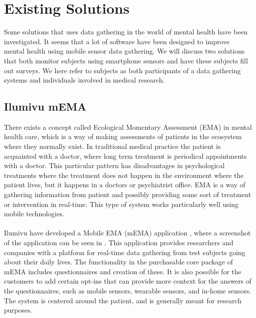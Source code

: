 
\section{Existing Solutions}
\label{sec:existing_solutions}



Some solutions that uses data gathering in the world of mental health have been investigated. It seems that a lot of software have been designed to improve mental health using mobile sensor data gathering. We will discuss two solutions that both monitor subjects using smartphone sensors and have these subjects fill out surveys. We here refer to subjects as both participants of a data gathering systems and individuals involved in medical research.

\subsection{Ilumivu mEMA}
\label{sub:ilumivu_mema}
There exists a concept called Ecological Momentary Assessment (EMA) \parencite{shiffman2008ecological} in mental health care, which is a way of making assessments of patients in the ecosystem where they normally exist. In traditional medical practice the patient is acquainted with a doctor, where long term treatment is periodical appointments with a doctor. This particular pattern has disadvantages in psychological treatments where the treatment does not happen in the environment where the patient lives, but it happens in a doctors or psychiatrist office. EMA is a way of gathering information from patient and possibly providing some sort of treatment or intervention in real-time. This type of system works particularly well using mobile technologies.
\\\\
Ilumivu have developed a Mobile EMA (mEMA) application \parencite{lumivu}, where a screenshot of the application can be seen in . This application provides researchers and companies with a platform for real-time data gathering from test subjects going about their daily lives. The functionality in the purchasable core package of mEMA includes questionnaires and creation of these. It is also possible for the customers to add certain opt-ins that can provide more context for the answers of the questionnaires, such as mobile sensors, wearable sensors, and in-home sensors. The system is centered around the patient, and is generally meant for research purposes.


